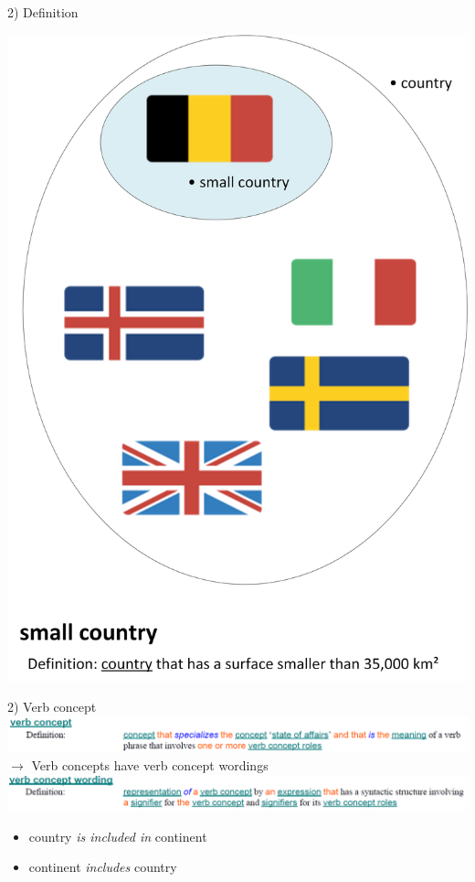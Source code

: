 \documentclass[t,12pt,english
\ifx\beamermode\undefined\else,\beamermode\fi
]{beamer}
\begin{document}
\begin{frame}{2) Definition}
	\begin{example}
		\centering
		\includegraphics[height=0.8\textheight]{assets/definitionVoorbeeld}
	\end{example}	
\end{frame}

\begin{frame}{2) Verb concept}
	\includegraphics[width=\linewidth]{assets/verbConcept} \\
	$ \rightarrow $ Verb concepts have verb concept wordings \\
	\vspace{0.2cm}
	\includegraphics[width=\linewidth]{assets/verbConceptWording}
	
	\begin{example}
		\begin{itemize}
			\item country \textit{is included in} continent
			\item continent \textit{includes} country
		\end{itemize}
	\end{example}
\end{frame}
\end{document}
